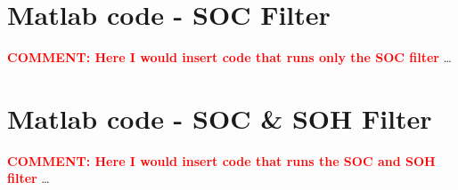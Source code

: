 \chapter{Matlab code - SOC Filter}\label{sec:something}

\textcolor{red}{\textbf{COMMENT: Here I would insert code that runs only the SOC filter}} \dots

 \cleardoublepage


\chapter{Matlab code - SOC \& SOH Filter}\label{sec:again_something}

\textcolor{red}{\textbf{COMMENT: Here I would insert code that runs the SOC and SOH filter}} \dots

 \cleardoublepage

